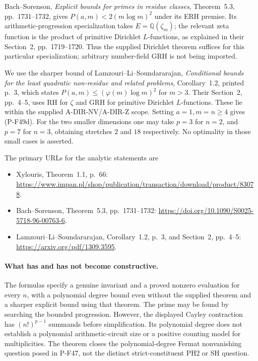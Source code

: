 \documentclass[11pt,a4paper]{article}
\begin{document}
Bach--Sorenson, \emph{Explicit bounds for primes in
residue classes}, Theorem~5.3, pp.~1731--1732, gives
$P(a,m)<2(m\log m)^2$ under its ERH premise. Its
arithmetic-progression specialization takes
$E=\mathbb Q(\zeta_m)$; the relevant zeta function is
the product of primitive Dirichlet $L$-functions, as
explained in their Section~2, pp.~1719--1720.
Thus the supplied Dirichlet theorem suffices for this
particular specialization; arbitrary number-field
GRH is not being imported.

We use the sharper bound of Lamzouri--Li--Soundararajan,
\emph{Conditional bounds for the least quadratic
non-residue and related problems}, Corollary~1.2,
printed p.~3, which states
$P(a,m)\le(\varphi(m)\log m)^2$ for $m>3$.
Their Section~2, pp.~4--5, uses RH for $\zeta$ and
GRH for primitive Dirichlet $L$-functions. These lie
within the supplied A-DIR-NV/A-DIR-Z scope. Setting
$a=1,m=n\ge4$ gives (P-F49d). For the two smaller
dimensions one may take $p=3$ for $n=2$, and $p=7$
for $n=3$, obtaining stretches $2$ and $18$ respectively.
No optimality in those small cases is asserted.

The primary URLs for the analytic statements are
\begin{itemize}
\item Xylouris, Theorem~1.1, p.~66:
\url{https://www.impan.pl/shop/publication/transaction/download/product/83078}.
\item Bach--Sorenson, Theorem~5.3, pp.~1731--1732:
\url{https://doi.org/10.1090/S0025-5718-96-00763-6}.
\item Lamzouri--Li--Soundararajan, Corollary~1.2,
p.~3, and Section~2, pp.~4--5:
\url{https://arxiv.org/pdf/1309.3595}.
\end{itemize}

\paragraph{What has and has not become constructive.}
The formulas specify a genuine invariant and a proved
nonzero evaluation for every $n$, with a polynomial
degree bound even without the supplied theorem and a
sharper explicit bound using that theorem. The prime
may be found by searching the bounded progression.
However, the displayed Cayley contraction has
$(n!)^{p-1}$ summands before simplification. Its polynomial
degree does not establish a polynomial arithmetic-circuit
size or a positive counting model for multiplicities.
The theorem closes the polynomial-degree Fermat
nonvanishing question posed in P-F47, not the distinct
strict-constituent PH2 or SH question.
\end{document}
